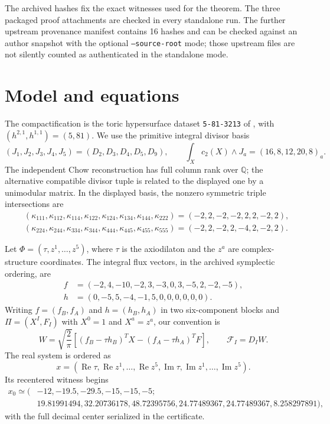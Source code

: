 \documentclass[11pt]{article}
\begin{document}
The archived hashes fix the exact witnesses used for the theorem.  The three
packaged proof attachments are checked in every standalone run.  The further
upstream provenance manifest contains 16 hashes and can be checked against an
author snapshot with the optional \texttt{--source-root} mode; those upstream
files are not silently counted as authenticated in the standalone mode.

\section{Model and equations}

The compactification is the toric hypersurface dataset \texttt{5-81-3213} of
\cite{Demirtas2021}, with $(h^{2,1},h^{1,1})=(5,81)$. We use the primitive
integral divisor basis
\begin{equation}
 (J_1,J_2,J_3,J_4,J_5)=(D_2,D_3,D_4,D_5,D_9),
 \qquad \int_X c_2(X)\wedge J_a=(16,8,12,20,8)_a.
\end{equation}
The independent Chow reconstruction has full column rank over $\mathbb Q$;
the alternative compatible divisor tuple is related to the displayed one by
a unimodular matrix. In the displayed basis, the nonzero symmetric triple
intersections are
\begin{align}
&(\kappa_{111},\kappa_{112},\kappa_{114},\kappa_{122},
  \kappa_{124},\kappa_{134},\kappa_{144},\kappa_{222})
 =(-2,2,-2,-2,2,2,-2,2),\\
&(\kappa_{224},\kappa_{244},\kappa_{334},\kappa_{344},
  \kappa_{444},\kappa_{445},\kappa_{455},\kappa_{555})
 =(-2,2,-2,2,-4,2,-2,2).
\end{align}

Let $\Phi=(\tau,z^1,\ldots,z^5)$, where $\tau$ is the axiodilaton and the
$z^a$ are complex-structure coordinates. The integral flux vectors, in the
archived symplectic ordering, are
\begin{align}
 f&=(-2,4,-10,-2,3,-3,0,3,-5,2,-2,-5),\\
 h&=(0,-5,5,-4,-1,5,0,0,0,0,0,0).
\end{align}
Writing $f=(f_B,f_A)$ and $h=(h_B,h_A)$ in two six-component blocks and
$\Pi=(X^I,F_I)$ with $X^0=1$ and $X^a=z^a$, our convention is
\begin{equation}
 W=\sqrt{\frac{2}{\pi}}\left[(f_B-\tau h_B)^T X
 -(f_A-\tau h_A)^T F\right],\qquad \mathcal F_I=D_IW.
\end{equation}
The real system is ordered as
\begin{equation}
 x=(\operatorname{Re}\tau,\operatorname{Re}z^1,\ldots,
 \operatorname{Re}z^5,\operatorname{Im}\tau,
 \operatorname{Im}z^1,\ldots,\operatorname{Im}z^5).
\end{equation}
Its recentered witness begins
\begin{align}
x_0\simeq(&-12,-19.5,-29.5,-15,-15,-5;\nonumber\\
          &19.81991494,32.20736178,48.72395756,
          24.77489367,24.77489367,8.258297891),
\end{align}
with the full decimal center serialized in the certificate.
\end{document}
